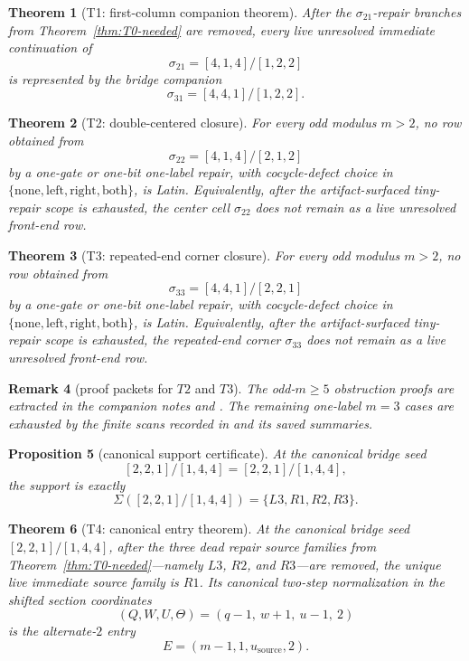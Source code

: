 \documentclass[11pt]{article}
\newtheorem{theorem}{Theorem}[section]
\newtheorem{proposition}[theorem]{Proposition}
\newtheorem{remark}[theorem]{Remark}
\newcommand{\sig}[2]{\sigma_{#1#2}}
\newcommand{\CanL}{[2,2,1]}
\newcommand{\CanR}{[1,4,4]}
\newcommand{\CanSeed}{\CanL/\CanR}
\begin{document}
\begin{theorem}[T1: first-column companion theorem]
\label{fr:T1}
After the \(\sig21\)-repair branches from Theorem~\ref{thm:T0-needed} are
removed, every live unresolved immediate continuation of
\[
\sig21=[4,1,4]/[1,2,2]
\]
is represented by the bridge companion
\[
\sig31=[4,4,1]/[1,2,2].
\]
\end{theorem}

\begin{theorem}[T2: double-centered closure]
\label{fr:T2}\label{thm:T2-closed}
For every odd modulus \(m>2\), no row obtained from
\[
\sig22=[4,1,4]/[2,1,2]
\]
by a one-gate or one-bit one-label repair, with cocycle-defect choice in
\(\{\mathrm{none},\mathrm{left},\mathrm{right},\mathrm{both}\}\), is Latin.
Equivalently, after the artifact-surfaced tiny-repair scope is exhausted, the
center cell \(\sig22\) does not remain as a live unresolved front-end row.
\end{theorem}

\begin{theorem}[T3: repeated-end corner closure]
\label{fr:T3}\label{thm:T3-closed}
For every odd modulus \(m>2\), no row obtained from
\[
\sig33=[4,4,1]/[2,2,1]
\]
by a one-gate or one-bit one-label repair, with cocycle-defect choice in
\(\{\mathrm{none},\mathrm{left},\mathrm{right},\mathrm{both}\}\), is Latin.
Equivalently, after the artifact-surfaced tiny-repair scope is exhausted, the
repeated-end corner \(\sig33\) does not remain as a live unresolved front-end row.
\end{theorem}

\begin{remark}[proof packets for \(T2\) and \(T3\)]
The odd-\(m\ge 5\) obstruction proofs are extracted in the companion notes
 and
.
The remaining one-label \(m=3\) cases are exhausted by the finite scans recorded
in  and its saved summaries.
\end{remark}

\begin{proposition}[canonical support certificate]
\label{prop:canonical-support}
At the canonical bridge seed
\[
\CanSeed=\CanL/\CanR,
\]
the support is exactly
\[
\Sigma(\CanSeed)=\{L3,R1,R2,R3\}.
\]
\end{proposition}

\begin{theorem}[T4: canonical entry theorem]
\label{fr:T4}
At the canonical bridge seed \(\CanSeed\), after the three dead repair source
families from Theorem~\ref{thm:T0-needed}---namely \(L3\), \(R2\), and
\(R3\)---are removed, the unique live immediate source family is \(R1\).
Its canonical two-step normalization in the shifted section coordinates
\[
(Q,W,U,\Theta)=(q-1,\ w+1,\ u-1,\ 2)
\]
is the alternate-$2$ entry
\[
E=(m-1,1,u_{\mathrm{source}},2).
\]
\end{theorem}
\end{document}
